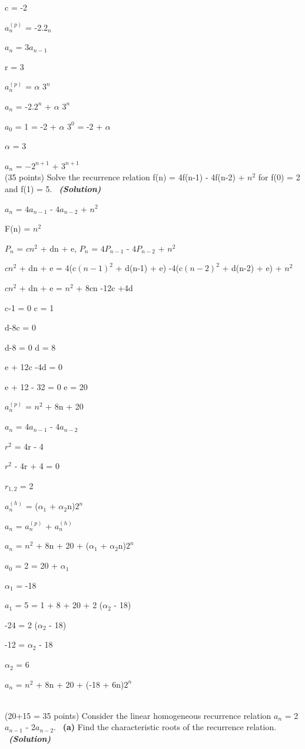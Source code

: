 \documentclass[a4 paper]{article}
\numberwithin{equation}{section}
\newcommand{\problem}[2]{~\\\fbox{\textbf{Problem #1}}\hfill (#2 points)\newline\newline}
\newcommand{\subproblem}[1]{~\newline\textbf{(#1)}}
\newcommand{\solution}{~\newline\textbf{\textit{(Solution)}} }
\newcommand{\0}{\mathbf{0}}
\begin{document}
c = -2

$a_n^{(p)}$ = -2.$2_n$

$a_n$ = $3a_{n-1}$

r = 3

$a_n^{(p)}$ = $\alpha$ $3^n$

$a_n$ = -2.$2^n$ + $\alpha$ $3^n$

$a_0$ = 1 = -2 + $\alpha$ $3^0$ = -2 + $\alpha$

$\alpha$ = 3

$a_n$ = $-2^{n+1}$ + $3^{n+1}$
\newpage
\problem{2}{35}
Solve the recurrence relation f(n) = 4f(n-1) - 4f(n-2) + $n^2$ for f(0) = 2 and f(1) = 5. 
\solution
\newline

$a_n$ = $4a_{n-1}$ - $4a_{n-2}$ + $n^2$

F(n) = $n^2$

$P_n$ = $cn^2$ + dn + e, $P_n$ = $4P_{n-1}$ - $4P_{n-2}$ + $n^2$

$cn^2$ + dn + e = 4(c$(n-1)^2$ + d(n-1) + e) -4(c$(n-2)^2$ + d(n-2) + e) + $n^2$

$cn^2$ + dn + e = $n^2$ + 8cn -12c +4d

c-1 = 0 \Rightarrow c = 1

d-8c = 0

d-8 = 0 \Rightarrow d = 8

e + 12c -4d = 0

e + 12 - 32 = 0 \Rightarrow e = 20

$a_n^{(p)}$ = $n^2$ + 8n + 20

$a_n$ = $4a_{n-1}$ - $4a_{n-2}$

$r^2$ = 4r - 4

$r^2$ - 4r + 4 = 0

$r_{1,2}$ = 2

$a_n^{(h)}$ = ($\alpha_1$ + $\alpha_2$n)$2^n$

$a_n$ = $a_n^{(p)}$ + $a_n^{(h)}$

$a_n$ = $n^2$ + 8n + 20 + ($\alpha_1$ + $\alpha_2$n)$2^n$

$a_0$ = 2 = 20 + $\alpha_1$

$\alpha_1$ = -18

$a_1$ = 5 = 1 + 8 + 20 + 2 ($\alpha_2$ - 18)

-24 = 2 ($\alpha_2$ - 18)

-12 = $\alpha_2$ - 18

$\alpha_2$ = 6

$a_n$ = $n^2$ + 8n + 20 + (-18 + 6n)$2^n$

\problem{3}{20+15 = 35}
Consider the linear homogeneous recurrence relation $a_n$ = 2$a_{n-1}$ - 2$a_{n-2}$.
\subproblem{a} Find the characteristic roots of the recurrence relation.
\solution
\newline
\end{document}
